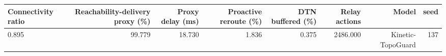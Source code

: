 \begin{tabular}{lrrrrrrr}
\toprule
Connectivity ratio & Reachability-delivery proxy (\%) & Proxy delay (ms) & Proactive reroute (\%) & DTN buffered (\%) & Relay actions & Model & seed \\
\midrule
0.895 & 99.779 & 18.730 & 1.836 & 0.375 & 2486.000 & Kinetic-TopoGuard & 137 \\
\bottomrule
\end{tabular}